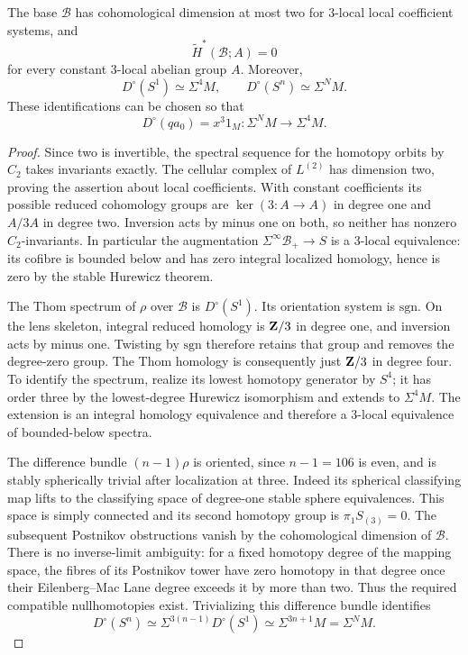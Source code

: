 \begin{lemma}\label{cube:lens-thom}
The base \(\mathcal B\) has cohomological dimension at most two
for 3-local local coefficient systems, and
\[
 \widetilde H^*(\mathcal B;A)=0
\]
for every constant 3-local abelian group \(A\).
Moreover,
\begin{equation}\label{cube:thom-identifications}
 D^\circ(S^1)\simeq\Sigma^4M,\qquad
 D^\circ(S^n)\simeq\Sigma^NM.
\end{equation}
These identifications can be chosen so that
\begin{equation}\label{cube:quotient-cube}
 D^\circ(qa_0)=x^3 1_M:
       \Sigma^NM\longrightarrow\Sigma^4M.
\end{equation}
\end{lemma}

\begin{proof}
Since two is invertible, the spectral sequence for the homotopy
orbits by \(C_2\) takes invariants exactly.  The cellular complex
of \(L^{(2)}\) has dimension two, proving the assertion about
local coefficients.  With constant coefficients its possible
reduced cohomology groups are
\(\ker(3:A\to A)\) in degree one and \(A/3A\) in degree two.
Inversion acts by minus one on both, so neither has nonzero
\(C_2\)-invariants.  In particular the augmentation
\(\Sigma^\infty\mathcal B_+\to S\) is a 3-local equivalence:
its cofibre is bounded below and has zero integral localized
homology, hence is zero by the stable Hurewicz theorem.

The Thom spectrum of \(\rho\) over \(\mathcal B\) is
\(D^\circ(S^1)\).  Its orientation system is \(\mathrm{sgn}\).
On the lens skeleton, integral reduced homology is
\(\mathbf Z/3\) in degree one, and inversion acts by minus one.
Twisting by \(\mathrm{sgn}\) therefore retains that group
and removes the degree-zero group.  The Thom homology is
consequently just \(\mathbf Z/3\) in degree four.
To identify the spectrum, realize its lowest homotopy generator
by \(S^4\); it has order three by the lowest-degree Hurewicz
isomorphism and extends to \(\Sigma^4M\).
The extension is an integral homology equivalence and therefore
a 3-local equivalence of bounded-below spectra.

The difference bundle \((n-1)\rho\) is oriented, since \(n-1=106\)
is even, and is stably spherically trivial after localization at
three.  Indeed its spherical classifying map lifts to the
classifying space of degree-one stable sphere equivalences.
This space is simply connected and its second homotopy group
is \(\pi_1S_{(3)}=0\).  The subsequent Postnikov obstructions
vanish by the cohomological dimension of \(\mathcal B\).
There is no inverse-limit ambiguity: for a fixed homotopy
degree of the mapping space, the fibres of its Postnikov
tower have zero homotopy in that degree once their
Eilenberg--Mac Lane degree exceeds it by more than two.
Thus the required compatible nullhomotopies exist.
Trivializing this difference bundle identifies
\[
 D^\circ(S^n)\simeq
 \Sigma^{3(n-1)}D^\circ(S^1)
 \simeq\Sigma^{3n+1}M=\Sigma^NM.
\]


\end{proof}
